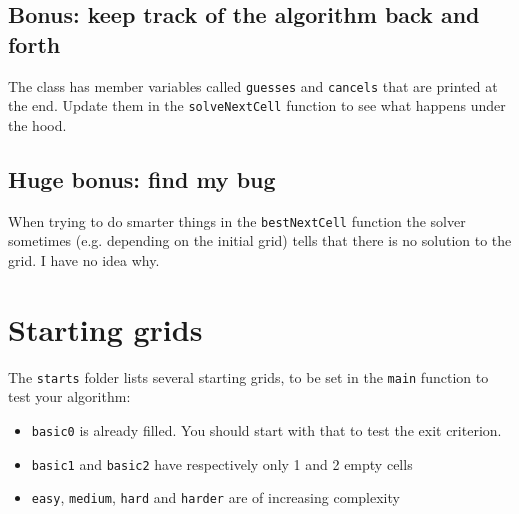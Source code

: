 \documentclass{ecnreport}
\begin{document}
\subsection{Bonus: keep track of the algorithm back and forth}

The \Grid class has member variables called \texttt{guesses} and \texttt{cancels} that are printed at the end. Update them in the \texttt{solveNextCell} function to see what happens under the hood.

\subsection{Huge bonus: find my bug}

When trying to do smarter things in the \texttt{bestNextCell} function the solver sometimes (e.g. depending on the initial grid) tells that there is no solution to the grid. I have no idea why.


\section{Starting grids}

The \texttt{starts} folder lists several starting grids, to be set in the \texttt{main} function to test your algorithm:
\begin{itemize}
 \item \texttt{basic0} is already filled. You should start with that to test the exit criterion.
 \item \texttt{basic1} and \texttt{basic2} have respectively only 1 and 2 empty cells
 \item \texttt{easy}, \texttt{medium}, \texttt{hard} and \texttt{harder} are of increasing complexity
\end{itemize}
\end{document}
